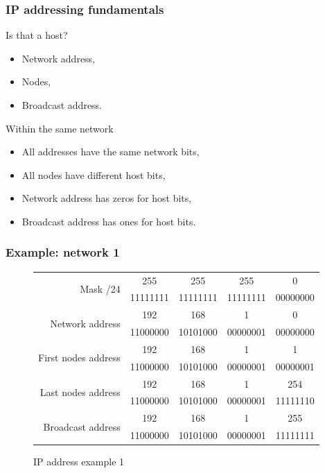   \begin{frame}
    \frametitle{IP addressing fundamentals}
    \begin{block}{Is that a host?}
      \begin{itemize}
        \item Network address,\pause
        \item Nodes,\pause
        \item Broadcast address.\pause
      \end{itemize}
    \end{block}
    \begin{block}{Within the same network}
      \begin{itemize}
        \item All addresses have the same network bits,\pause
        \item All nodes have different host bits,\pause
        \item Network address has zeros for host bits,\pause
        \item Broadcast address has ones for host bits.
      \end{itemize}
    \end{block}
  \end{frame}

  \begin{frame}
    \frametitle{Example: network 1}
    \begin{figure}
        \centering
      \begin{tabular}{|r|cccc|}
        \hline
        \multirow{2}{*}{Mask /24} & {\color{brown}255} & {\color{brown}255} & {\color{brown}255} & {\color{brown}0} \\
        & {\color{brown}11111111} & {\color{brown}11111111} & {\color{brown}11111111} & {\color{brown}00000000} \\ \hline
        \multirow{2}{*}{Network address} & \color{brown}192 & \color{brown}168 & \color{brown}1 & \color{blue}0 \\
        & \color{brown}11000000 & \color{brown}10101000 & \color{brown}00000001 & \color{blue}00000000 \\ \hline
        \multirow{2}{*}{First nodes address} & \color{brown}192 & \color{brown}168 & \color{brown}1 & \color{blue}1 \\
        & \color{brown}11000000 & \color{brown}10101000 & \color{brown}00000001 & \color{blue}00000001 \\ \hline
        \multirow{2}{*}{Last nodes address} & \color{brown}192 & \color{brown}168 & \color{brown}1 & \color{blue}254 \\
        & \color{brown}11000000 & \color{brown}10101000 & \color{brown}00000001 & \color{blue}11111110 \\ \hline
        \multirow{2}{*}{Broadcast address} & \color{brown}192 & \color{brown}168 & \color{brown}1 & \color{blue}255 \\
        & \color{brown}11000000 & \color{brown}10101000 & \color{brown}00000001 & \color{blue}11111111 \\ \hline
      \end{tabular}
      \caption{IP address example 1}
    \end{figure}
  \end{frame}

